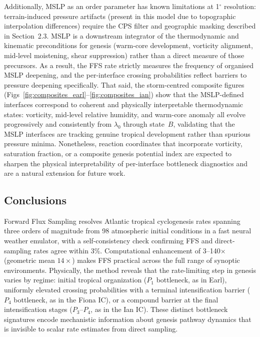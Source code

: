 \documentclass[11pt]{article}
\begin{document}
Additionally, MSLP as an order parameter has known limitations at 1$^\circ$ resolution:
terrain-induced pressure artifacts (present in this model due to topographic interpolation
differences) require the CPS filter and geographic masking described in Section~2.3.
MSLP is a downstream integrator of the thermodynamic and kinematic preconditions for
genesis (warm-core development, vorticity alignment, mid-level moistening, shear
suppression) rather than a direct measure of those precursors.
As a result, the FFS rate strictly measures the frequency of organised MSLP deepening,
and the per-interface crossing probabilities reflect barriers to pressure deepening
specifically.
That said, the storm-centred composite figures (Figs~\ref{fig:composites_earl}--\ref{fig:composites_ian})
show that the MSLP-defined interfaces correspond to coherent and physically interpretable
thermodynamic states: vorticity, mid-level relative humidity, and warm-core anomaly all
evolve progressively and consistently from $\lambda_0$ through state~$B$, validating
that the MSLP interfaces are tracking genuine tropical development rather than spurious
pressure minima.
Nonetheless, reaction coordinates that incorporate vorticity, saturation fraction, or a
composite genesis potential index \citep[e.g.,][]{bister1998dissipative,camargo2007use}
are expected to sharpen the physical interpretability of per-interface bottleneck
diagnostics and are a natural extension for future work.

\subsection{Conclusions}

Forward Flux Sampling resolves Atlantic tropical cyclogenesis rates spanning three orders
of magnitude from 98 atmospheric initial conditions in a fast neural weather emulator,
with a self-consistency check confirming FFS and direct-sampling rates agree within 3\%.
Computational enhancement of 3--140$\times$ (geometric mean $14\times$) makes FFS
practical across the full range of synoptic environments. Physically, the method reveals
that the rate-limiting step in genesis varies by regime: initial tropical organization
($P_1$ bottleneck, as in Earl), uniformly elevated crossing probabilities with a terminal
intensification barrier ($P_4$ bottleneck, as in the Fiona IC), or a compound
barrier at the final intensification stages ($P_3$--$P_4$, as in the Ian IC).
These distinct bottleneck signatures encode mechanistic information about genesis pathway
dynamics that is invisible to scalar rate estimates from direct sampling.
\end{document}
